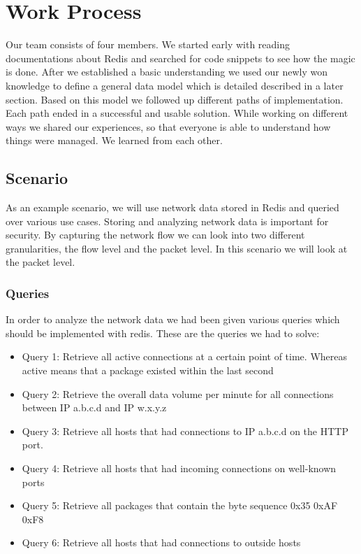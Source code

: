 \chapter{Work Process}

Our team consists of four members. We started early with reading documentations about Redis and searched for code snippets to see how the magic is done. After we established a basic understanding we used our newly won knowledge to define a general data model which is detailed described in a later section. Based on this model we followed up different paths of implementation. Each path ended in a successful and usable solution. While working on different ways we shared our experiences, so that everyone is able to understand how things were managed. We learned from each other.

\section{Scenario}

As an example scenario, we will use network data stored in Redis and queried over various use cases. Storing and analyzing network data is important for security. By capturing the network flow we can look into two different granularities, the flow level and the packet level. In this scenario we will look at the packet level.

\subsection{Queries}
In order to analyze the network data we had been given various queries which should be implemented with redis. These are the queries we had to solve:
\begin{itemize}
	\item Query 1:
Retrieve all active connections at a certain point of time. Whereas active means that a package existed within the last second

\item Query 2:
Retrieve the overall data volume per minute for all connections between IP a.b.c.d and IP w.x.y.z

\item Query 3:
Retrieve all hosts that had connections to IP a.b.c.d on the HTTP port.

\item Query 4:
Retrieve all hosts that had incoming connections on well-known ports

\item Query 5:
Retrieve all packages that contain the byte sequence 0x35 0xAF 0xF8

\item Query 6:
Retrieve all hosts that had connections to outside hosts

\end{itemize}

